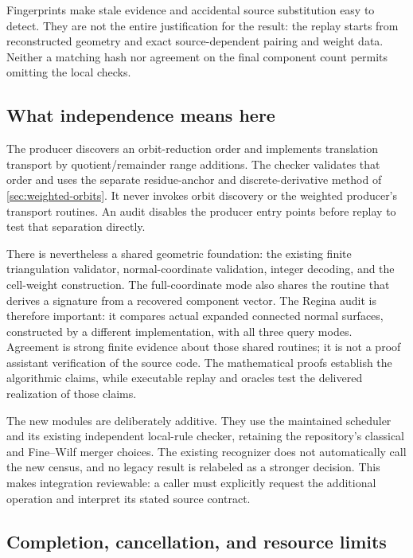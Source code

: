 Fingerprints make stale evidence and accidental source substitution easy to
detect. They are not the entire justification for the result: the replay
starts from reconstructed geometry and exact source-dependent pairing and
weight data. Neither a matching hash nor agreement on the final component
count permits omitting the local checks.

\subsection{What independence means here}

The producer discovers an orbit-reduction order and implements translation
transport by quotient/remainder range additions. The checker validates that
order and uses the separate residue-anchor and discrete-derivative method of
\cref{sec:weighted-orbits}. It never invokes orbit discovery or the weighted
producer's transport routines. An audit disables the producer entry points
before replay to test that separation directly.

There is nevertheless a shared geometric foundation: the existing finite
triangulation validator, normal-coordinate validation, integer decoding, and
the cell-weight construction. The full-coordinate mode also shares the
routine that derives a signature from a recovered component vector. The
Regina audit is therefore important: it compares actual expanded connected
normal surfaces, constructed by a different implementation, with all three
query modes. Agreement is strong finite evidence about those shared routines;
it is not a proof assistant verification of the source code. The mathematical
proofs establish the algorithmic claims, while executable replay and oracles
test the delivered realization of those claims.

The new modules are deliberately additive. They use the maintained
 scheduler and its existing independent local-rule
checker, retaining the repository's classical and Fine--Wilf merger choices.
The existing recognizer does not automatically call the new census, and no
legacy result is relabeled as a stronger decision. This makes integration
reviewable: a caller must explicitly request the additional operation and
interpret its stated source contract.

\subsection{Completion, cancellation, and resource limits}

